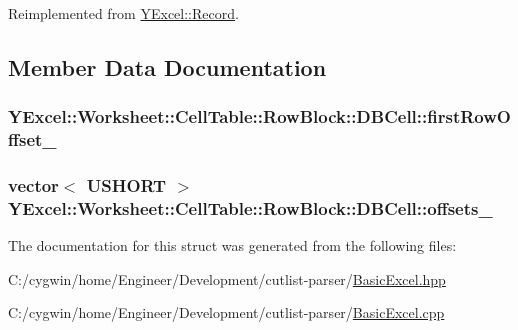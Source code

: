 Reimplemented from \hyperlink{class_y_excel_1_1_record_ab0f4a000eb54ce28447d907884a3f2fe}{Y\+Excel\+::\+Record}.



\subsection{Member Data Documentation}
\hypertarget{struct_y_excel_1_1_worksheet_1_1_cell_table_1_1_row_block_1_1_d_b_cell_ac47e80b8012a4989e926b7bfcfdff4cb}{}
\subsubsection[{first\+Row\+Offset\+\_\+}]{ Y\+Excel\+::\+Worksheet\+::\+Cell\+Table\+::\+Row\+Block\+::\+D\+B\+Cell\+::first\+Row\+Offset\+\_\+}\label{struct_y_excel_1_1_worksheet_1_1_cell_table_1_1_row_block_1_1_d_b_cell_ac47e80b8012a4989e926b7bfcfdff4cb}
\hypertarget{struct_y_excel_1_1_worksheet_1_1_cell_table_1_1_row_block_1_1_d_b_cell_a4ff4295284571c1babeaa3e63fbf5eb9}{}
\subsubsection[{offsets\+\_\+}]{\setlength{\rightskip}{0pt plus 5cm}vector$<$ {\bf U\+S\+H\+O\+R\+T} $>$ Y\+Excel\+::\+Worksheet\+::\+Cell\+Table\+::\+Row\+Block\+::\+D\+B\+Cell\+::offsets\+\_\+}\label{struct_y_excel_1_1_worksheet_1_1_cell_table_1_1_row_block_1_1_d_b_cell_a4ff4295284571c1babeaa3e63fbf5eb9}


The documentation for this struct was generated from the following files\+:\begin{DoxyCompactItemize}
\item 
C\+:/cygwin/home/\+Engineer/\+Development/cutlist-\/parser/\hyperlink{_basic_excel_8hpp}{Basic\+Excel.\+hpp}\item 
C\+:/cygwin/home/\+Engineer/\+Development/cutlist-\/parser/\hyperlink{_basic_excel_8cpp}{Basic\+Excel.\+cpp}\end{DoxyCompactItemize}
